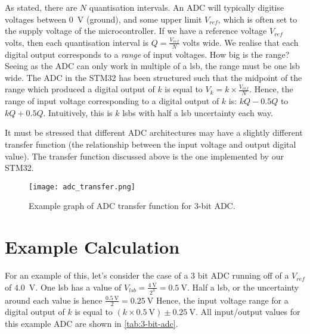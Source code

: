 As stated, there are \(N\) quantisation intervals. An ADC will typically digitise voltages between \SI{0}{\volt} (ground), and some upper limit \(V_{ref}\), which is often set to the supply voltage of the microcontroller. If we have a reference voltage \(V_{ref}\) volts, then each quantisation interval is \(Q = \frac{V_{ref}}{N}\) volts wide.
We realise that each digital output corresponds to a \emph{range} of input voltages. How big is the range? Seeing as the ADC can only work in multiple of a lsb, the range must be one lsb wide. 
The ADC in the STM32 has been structured such that the midpoint of the range which produced a digital output of \(k\) is equal to \(V_{k} = k \times \frac{V_{ref}}{N}\). 
Hence, the range of input voltage corresponding to a digital output of \(k\) is: \(kQ - 0.5Q\) to \(kQ + 0.5Q\). Intuitively, this is \(k\) lsbs with half a lsb uncertainty each way. 

It must be stressed that different ADC architectures may have a slightly different transfer function (the relationship between the input voltage and output digital value). 
The transfer function discussed above is the one implemented by our STM32.

\begin{figure}
  \centering
  \texttt{[image: adc\_transfer.png]}
  \caption{Example graph of ADC transfer function for 3-bit ADC.}
  \label{fig:adc-transfer-graph}
\end{figure}


\section{Example Calculation}
For an example of this, let's consider the case of a 3 bit ADC running off of a \(V_{ref}\) of \SI{4.0}{\volt}. One lsb has a value of \(V_{lsb} = \frac{\SI{4}{\volt}}{2^3} = \SI{0.5}{\volt}\).
Half a lsb, or the uncertainty around each value is hence \(\frac{\SI{0.5}{\volt}}{2} = \SI{0.25}{\volt}\)
Hence, the input voltage range for a digital output of \(k\) is equal to \((k \times \SI{0.5}{\volt}) \pm \SI{0.25}{\volt}\).
All input/output values for this example ADC are shown in \autoref{tab:3-bit-adc}. \\

